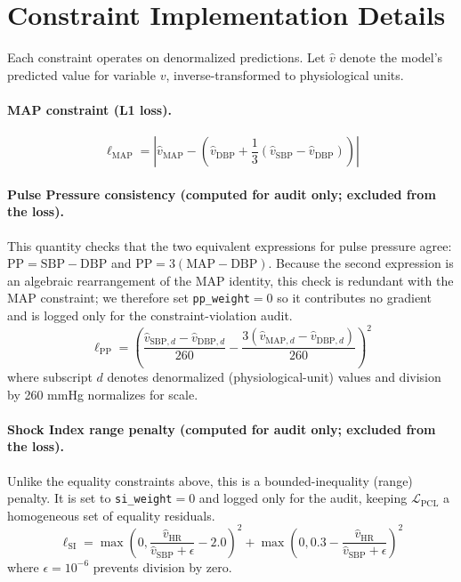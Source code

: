 \documentclass{article}
\begin{document}
\section{Constraint Implementation Details}
\label{app:constraints}

Each constraint operates on denormalized predictions. Let $\hat{v}$ denote the model's predicted value for variable $v$, inverse-transformed to physiological units.

\paragraph{MAP constraint (L1 loss).}
\begin{equation}
\ell_{\text{MAP}} = \left| \hat{v}_{\text{MAP}} - \left(\hat{v}_{\text{DBP}} + \frac{1}{3}(\hat{v}_{\text{SBP}} - \hat{v}_{\text{DBP}})\right) \right|
\end{equation}

\paragraph{Pulse Pressure consistency (computed for audit only; excluded from the loss).}
This quantity checks that the two equivalent expressions for pulse pressure agree: $\text{PP} = \text{SBP} - \text{DBP}$ and $\text{PP} = 3(\text{MAP} - \text{DBP})$. Because the second expression is an algebraic rearrangement of the MAP identity, this check is redundant with the MAP constraint; we therefore set \texttt{pp\_weight}$=0$ so it contributes no gradient and is logged only for the constraint-violation audit.
\begin{equation}
\ell_{\text{PP}} = \left(\frac{\hat{v}_{\text{SBP},d} - \hat{v}_{\text{DBP},d}}{260} - \frac{3(\hat{v}_{\text{MAP},d} - \hat{v}_{\text{DBP},d})}{260}\right)^2
\end{equation}
where subscript $d$ denotes denormalized (physiological-unit) values and division by 260 mmHg normalizes for scale.

\paragraph{Shock Index range penalty (computed for audit only; excluded from the loss).}
Unlike the equality constraints above, this is a bounded-inequality (range) penalty. It is set to \texttt{si\_weight}$=0$ and logged only for the audit, keeping $\mathcal{L}_{\text{PCL}}$ a homogeneous set of equality residuals.
\begin{equation}
\ell_{\text{SI}} = \max\left(0, \frac{\hat{v}_{\text{HR}}}{\hat{v}_{\text{SBP}} + \epsilon} - 2.0\right)^2 + \max\left(0, 0.3 - \frac{\hat{v}_{\text{HR}}}{\hat{v}_{\text{SBP}} + \epsilon}\right)^2
\end{equation}
where $\epsilon = 10^{-6}$ prevents division by zero.
\end{document}
